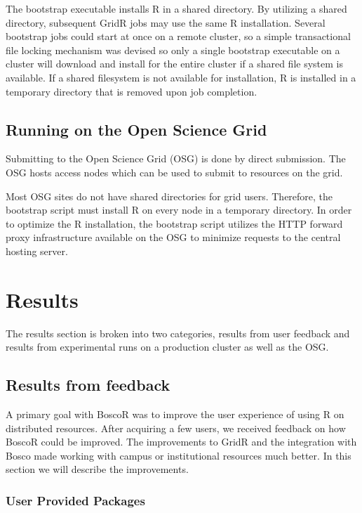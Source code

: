 \documentclass[conference]{IEEEtran}
\begin{document}
The bootstrap executable installs R in a shared directory.  By utilizing a shared directory, subsequent GridR jobs may use the same R installation.  Several bootstrap jobs could start at once on a remote cluster, so a simple transactional file locking mechanism was devised so only a single bootstrap executable on a cluster will download and install for the entire cluster if a shared file system is available.  If a shared filesystem is not available for installation, R is installed in a temporary directory that is removed upon job completion.

\subsection{Running on the Open Science Grid}

Submitting to the Open Science Grid (OSG) is done by direct submission.  The OSG hosts access nodes which can be used to submit to resources on the grid.

Most OSG sites do not have shared directories for grid users.  Therefore, the bootstrap script must install R on every node in a temporary directory.  In order to optimize the R installation, the bootstrap script utilizes the HTTP forward proxy infrastructure \cite{garzoglio2012supporting} available on the OSG to minimize requests to the central hosting server.


\section{Results}
\label{sec:results}

The results section is broken into two categories, results from user feedback and results from experimental runs on a production cluster as well as the OSG.

\subsection{Results from feedback}

A primary goal with BoscoR was to improve the user experience of using R on distributed resources. After acquiring a few users, we received feedback on how BoscoR could be improved.  The improvements to GridR and the integration with Bosco made working with campus or institutional resources much better.  In this section we will describe the improvements.

\subsubsection{User Provided Packages}
\end{document}
